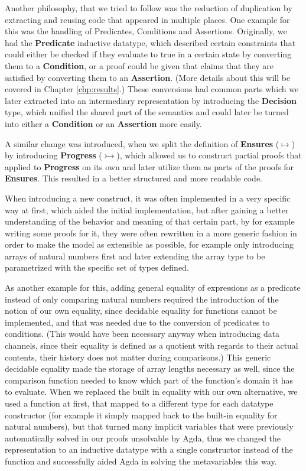 Another philosophy, that we tried to follow was the reduction of duplication by extracting and reusing code that appeared in multiple places. One example for this was the handling of Predicates, Conditions and Assertions. Originally, we had the \textbf{Predicate} inductive datatype, which described certain constraints that could either be checked if they evaluate to true in a certain state by converting them to a \textbf{Condition}, or a proof could be given that claims that they are satisfied by converting them to an \textbf{Assertion}. (More details about this will be covered in Chapter \ref{chp:results}.) These conversions had common parts which we later extracted into an intermediary representation by introducing the \textbf{Decision} type, which unified the shared part of the semantics and could later be turned into either a \textbf{Condition} or an \textbf{Assertion} more easily.

\newpage

A similar change was introduced, when we split the definition of \textbf{Ensures} ($\mapsto$) by introducing \textbf{Progress} ($\rightarrowtail$), which allowed us to construct partial proofs that applied to \textbf{Progress} on its own and later utilize them as parts of the proofs for \textbf{Ensures}. This resulted in a better structured and more readable code.

When introducing a new construct, it was often implemented in a very specific way at first, which aided the initial implementation, but after gaining a better understanding of the behavior and meaning of that certain part, by for example writing some proofs for it, they were often rewritten in a more generic fashion in order to make the model as extensible as possible, for example only introducing arrays of natural numbers first and later extending the array type to be parametrized with the specific set of types defined.

As another example for this, adding general equality of expressions as a predicate instead of only comparing natural numbers required the introduction of the notion of our own equality, since decidable equality for functions cannot be implemented, and that was needed due to the conversion of predicates to conditions. (This would have been necessary anyway when introducing data channels, since their equality is defined as a quotient with regards to their actual contents, their history does not matter during comparisons.) This generic decidable equality made the storage of array lengths necessary as well, since the comparison function needed to know which part of the function's domain it has to evaluate. When we replaced the built in equality with our own alternative, we used a function at first, that mapped to a different type for each datatype constructor (for example it simply mapped back to the built-in equality for natural numbers), but that turned many implicit variables that were previously automatically solved in our proofs unsolvable by Agda, thus we changed the representation to an inductive datatype with a single constructor instead of the function and successfully aided Agda in solving the metavariables this way.

